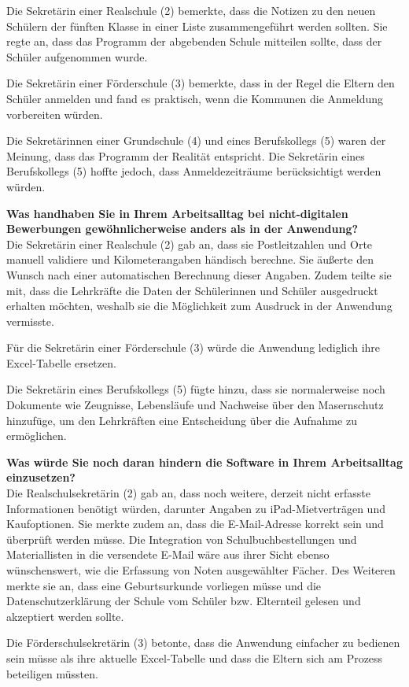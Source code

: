 Die Sekretärin einer Realschule (2) bemerkte, dass die Notizen zu den neuen Schülern der fünften Klasse in einer Liste zusammengeführt werden sollten. Sie regte an, dass das Programm der abgebenden Schule mitteilen sollte, dass der Schüler aufgenommen wurde.

Die Sekretärin einer Förderschule (3) bemerkte, dass in der Regel die Eltern den Schüler anmelden und fand es praktisch, wenn die Kommunen die Anmeldung vorbereiten würden.

Die Sekretärinnen einer Grundschule (4) und eines Berufskollegs (5) waren der Meinung, dass das Programm der Realität entspricht. Die Sekretärin eines Berufskollegs (5) hoffte jedoch, dass Anmeldezeiträume berücksichtigt werden würden.

\textbf{Was handhaben Sie in Ihrem Arbeitsalltag bei nicht-digitalen Bewerbungen gewöhnlicherweise anders als in der Anwendung?}\\
Die Sekretärin einer Realschule (2) gab an, dass sie Postleitzahlen und Orte manuell validiere und Kilometerangaben händisch berechne. Sie äußerte den Wunsch nach einer automatischen Berechnung dieser Angaben. Zudem teilte sie mit, dass die Lehrkräfte die Daten der Schülerinnen und Schüler ausgedruckt erhalten möchten, weshalb sie die Möglichkeit zum Ausdruck in der Anwendung vermisste.

Für die Sekretärin einer Förderschule (3) würde die Anwendung lediglich ihre Excel-Tabelle ersetzen.

Die Sekretärin eines Berufskollegs (5) fügte hinzu, dass sie normalerweise noch Dokumente wie Zeugnisse, Lebensläufe und Nachweise über den Masernschutz hinzufüge, um den Lehrkräften eine Entscheidung über die Aufnahme zu ermöglichen.

\textbf{Was würde Sie noch daran hindern die Software in Ihrem Arbeitsalltag einzusetzen?}\\
Die Realschulsekretärin (2) gab an, dass noch weitere, derzeit nicht erfasste Informationen benötigt würden, darunter Angaben zu iPad-Mietverträgen und Kaufoptionen. Sie merkte zudem an, dass die E-Mail-Adresse korrekt sein und überprüft werden müsse. Die Integration von Schulbuchbestellungen und Materiallisten in die versendete E-Mail wäre aus ihrer Sicht ebenso wünschenswert, wie die Erfassung von Noten ausgewählter Fächer. Des Weiteren merkte sie an, dass eine Geburtsurkunde vorliegen müsse und die Datenschutzerklärung der Schule vom Schüler bzw. Elternteil gelesen und akzeptiert werden sollte.

Die Förderschulsekretärin (3) betonte, dass die Anwendung einfacher zu bedienen sein müsse als ihre aktuelle Excel-Tabelle und dass die Eltern sich am Prozess beteiligen müssten.

